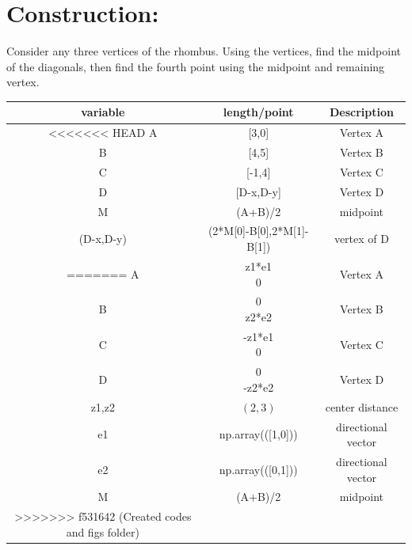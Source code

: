 \documentclass[a4paper,12pt,twocolumn]{article}
\newcommand{\myvec}[1]{\ensuremath{\begin{pmatrix}#1\end{pmatrix}}}
\begin{document}
\section{Construction:}
Consider any  three vertices of the rhombus. Using the vertices, find the midpoint of the diagonals, then find the fourth point using the midpoint and remaining vertex. 
\begin{table}[h]
	\centering
\setlength\extrarowheight{2pt}
	\begin{tabular}{|c|c|c|}
		\hline
		\textbf{variable} & \textbf{length/point} & \textbf{Description}\\
		\hline
<<<<<<< HEAD
		A & [3,0] & Vertex A\\
		\hline
		B & [4,5] & Vertex B\\
		\hline
		C & [-1,4] & Vertex C\\
		\hline                   
		D & [D-x,D-y] & Vertex D\\
		\hline
		M & (A+B)/2 & midpoint\\
		\hline
		(D-x,D-y) & (2*M[0]-B[0],2*M[1]-B[1]) & vertex of D\\
		\hline
=======
		A & \myvec{z1*e1\\0} & Vertex A\\
		\hline
		B & \myvec{0\\z2*e2} & Vertex B\\
		\hline
		C & \myvec{-z1*e1\\0} & Vertex C\\
		\hline                   
		D & \myvec{0\\-z2*e2} & Vertex D\\
		\hline
		z1,z2 & $(2,3)$ & center distance\\
		\hline
		e1 & np.array(([1,0])) & directional vector\\
		\hline
		e2 & np.array(([0,1])) & directional vector\\
		\hline
		M & (A+B)/2 & midpoint\\
		\hline
>>>>>>> f531642 (Created codes and figs folder)
	\end{tabular}
\end{table}
\end{document}
